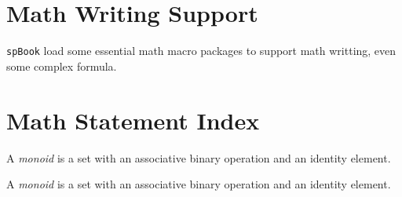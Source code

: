 
    \section{Math Writing Support}
        \texttt{spBook} load some essential math macro packages to support math writting, even some complex formula.
        

    \section{Math Statement Index}
        \begin{definition}[Monoid]
            A \emph{monoid} is a set with an associative binary operation and an identity element.
        \end{definition}
        \begin{theorem}[Schur]
            A \emph{monoid} is a set with an associative binary operation and an identity element.
        \end{theorem}